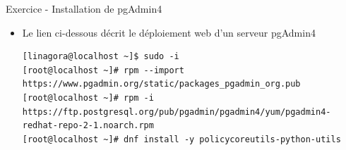 
\begin{frame}[fragile]{Exercice - Installation de pgAdmin4}

   \begin{itemize}
      \item Le lien ci-dessous décrit le déploiement web d'un serveur pgAdmin4

\begin{tiny}
\begin{Verbatim}[commandchars=\\\{\}]
[linagora@localhost ~]$ sudo -i
[root@localhost ~]# rpm --import https://www.pgadmin.org/static/packages_pgadmin_org.pub
[root@localhost ~]# rpm -i https://ftp.postgresql.org/pub/pgadmin/pgadmin4/yum/pgadmin4-redhat-repo-2-1.noarch.rpm
[root@localhost ~]# dnf install -y policycoreutils-python-utils
\end{Verbatim}
\end{tiny}

   \end{itemize}

\begin{tiny}
\begin{toile}
\end{toile}
\end{tiny}

\end{frame}


